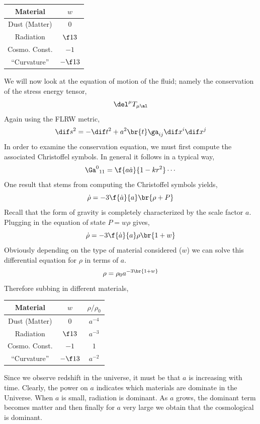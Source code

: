 \documentclass{article}
\begin{document}
\begin{center}
\begin{tabular}{|c|c|}
    \hline
    Material & $w$ \\
    \hline
    Dust (Matter) & $0$ \\
    Radiation & $\f13$ \\
    Cosmo. Const. & $-1$ \\
    ``Curvature'' & $-\f13$ \\
    \hline
\end{tabular}
\end{center}
We will now look at the equation of motion of the fluid; namely the conservation of the stress energy tensor,
\[ \del^\mu T_{\mu\al} \]
Again using the FLRW metric,
\[ \dif s^2 = - \dif t^2 + a^2 \br{t} \ga_{ij} \dif x^i \dif x^j \]
In order to examine the conservation equation, we must first compute the associated Christoffel symbols. In general it follows in a typical way,
\[ {\Ga^{0}}_{11} = \f{a \dot{a}}{1 - k r^2} \cdots \]
One result that stems from computing the Christoffel symbols yields,
\[ \dot{\rho} = - 3 \f{\dot{a}}{a} \br{\rho + P} \]
Recall that the form of gravity is completely characterized by the scale factor $a$. Plugging in the equation of state $P = w \rho$ gives,
\[ \dot{\rho} = - 3 \f{\dot{a}}{a}\rho \br{1 + w} \]
Obviously depending on the type of material considered ($w$) we can solve this differential equation for $\rho$ in terms of $a$.
\[ \rho = \rho_0 a^{-3 \br{1 + w}} \]
Therefore subbing in different materials,

\begin{center}
\begin{tabular}{|c|c|c|}
    \hline
    Material & $w$ & $\rho/\rho_0$\\
    \hline
    Dust (Matter) & $0$ & $a^{-4}$\\
    Radiation & $\f13$ & $a^{-3}$ \\
    Cosmo. Const. & $-1$ & $1$ \\
    ``Curvature'' & $-\f13$ & $a^{-2}$ \\
    \hline
\end{tabular}
\end{center}

Since we observe redshift in the universe, it must be that $a$ is increasing with time. Clearly, the power on $a$ indicates which materials are dominate in the Universe. When $a$ is small, radiation is dominant. As $a$ grows, the dominant term becomes matter and then finally for $a$ very large we obtain that the cosmological is dominant.
\end{document}
